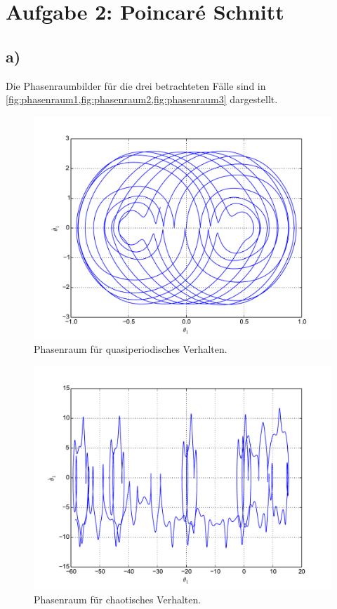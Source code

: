 \section*{Aufgabe 2: Poincaré Schnitt}
\subsection*{a)}
Die Phasenraumbilder für die drei betrachteten Fälle sind in \cref{fig:phasenraum1,fig:phasenraum2,fig:phasenraum3} dargestellt.
\begin{figure}[h!]
	\includegraphics[width = \textwidth]{../Plots/Plot_2_A_1_Phasenraum.pdf}
	\caption{Phasenraum für quasiperiodisches Verhalten.\label{fig:phasenraum1}}
\end{figure}

\begin{figure}[H]
	\includegraphics[width = \textwidth]{../Plots/Plot_2_A_2_Phasenraum.pdf}
	\caption{Phasenraum für chaotisches Verhalten.\label{fig:phasenraum2}}
\end{figure}

